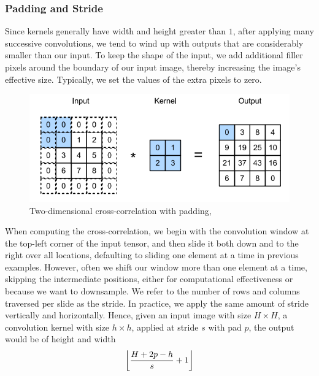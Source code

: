 \documentclass{beamer}
\DeclarePairedDelimiter\floor{\lfloor}{\rfloor}
\begin{document}
\begin{frame}[allowframebreaks]
\frametitle{Padding and Stride}
Since kernels generally have width and height greater than $1$, after applying many successive convolutions, we tend to wind up with outputs that are considerably smaller than our input. To keep the shape of the input, we add additional filler pixels around the boundary of our input image, thereby increasing the image's effective size. Typically, we set the values of the extra pixels to zero.
\begin{figure}[H]
\centering
\includegraphics[scale=0.5]{png/padding.png}
\caption{Two-dimensional cross-correlation with padding, {\cite{zhang2020dive}}}
\label{fig:pad}
\end{figure}
When computing the cross-correlation, we begin with the convolution window at the top-left corner of the input tensor, and then slide it both down and to the right over all locations, defaulting to sliding one element at a time in previous examples. However, often we shift our window more than one element at a time, skipping the intermediate positions, either for computational effectiveness or because we want to downsample. We refer to the number of rows and columns traversed per slide as the stride. In practice, we apply the same amount of stride vertically and horizontally. Hence, given an input image with size $H \times H$, a convolution kernel with size $h \times h$, applied at stride $s$ with pad $p$, the output would be of height and width
\begin{equation}\label{eqn:pad_stride}
\floor*{\dfrac{H + 2p - h}{s} + 1}
\end{equation}
\end{frame}
\end{document}

